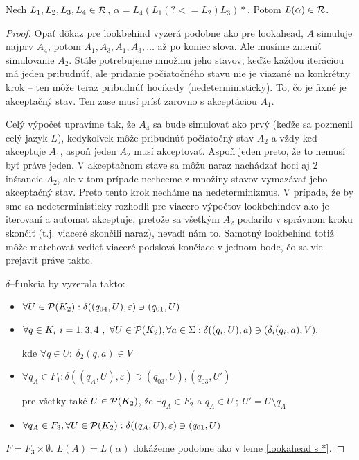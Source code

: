 \begin{lema}\label{lookbehind s *}
Nech $L_1,L_2,L_3,L_4 \in \R$, $\alpha = L_4 \left( L_1 \left( ?<=L_2\right) L_3 \right) *$. Potom $L(\alpha) \in \R$.
\end{lema} 
\begin{proof}
Opäť dôkaz pre lookbehind vyzerá podobne ako pre lookahead, $A$ simuluje naj\-prv $A_4$, potom $A_1,A_3,A_1,A_3, \dots$ až po koniec slova. Ale musíme zmeniť simulovanie $A_2$. Stále potrebujeme množinu jeho stavov, keďže každou iteráciou má jeden pribudnúť, ale pridanie počiatočného stavu nie je viazané na konkrétny krok -- ten môže teraz pribudnúť hocikedy (nedeterministicky). To, čo je fixné je akceptačný stav. Ten zase musí prísť zarovno s akceptáciou $A_1$. 

Celý výpočet upravíme tak, že $A_4$ sa bude simulovať ako prvý (keďže sa pozmenil celý jazyk $L$), kedykoľvek môže pribudnúť počiatočný stav $A_2$ a vždy keď akceptuje $A_1$, aspoň jeden $A_2$ musí akceptovať. Aspoň jeden preto, že to nemusí byť práve jeden. V akceptačnom stave sa môžu naraz nachádzať hoci aj 2 inštancie $A_2$, ale v tom prípade nechceme z množiny stavov vymazávať jeho akceptačný stav. Preto tento krok necháme na nedeterminizmus. V prípade, že by sme sa nedeterministicky rozhodli pre viacero výpočtov lookbehindov ako je iterovaní a automat akceptuje, pretože sa všetkým $A_2$ podarilo v správnom kroku skončiť (t.j. viaceré skončili naraz), nevadí nám to. Samotný lookbehind totiž môže matchovať vedieť viaceré podslová končiace v jednom bode, čo sa vie prejaviť práve takto. 

$\delta$--funkcia by vyzerala takto:

\begin{itemize}
  \item $\forall U \in \P(K_2) : \delta ((q_{04},U),\varepsilon ) \ni (q_{01},U)$
  \item $\forall q \in K_i~i=1,3,4 ~, ~\forall U \in \P(K_2),\forall a \in \Sigma : \delta ((q_i,U),a) \ni (\delta _i (q_i,a),V),$
  
  kde $\forall q \in U:~\delta_2(q,a) \in V$
  \item $\forall q_A \in F_1 : \delta ((q_A,U),\varepsilon ) \ni (q_{03},U), (q_{03},U')$
  
  pre všetky také $U \in \P(K_2)$, že $ \exists q_A \in F_2$ a $ q_A \in U ~ ; ~ U'=U \setminus q_A$
  \item $\forall q_A \in F_3, \forall U \in \P(K_2) : \delta ((q_A,U),\varepsilon ) \ni (q_{01},U)$
\end{itemize}
$F = F_3 \times \emptyset$. $L(A) = L(\alpha)$ dokážeme podobne ako v leme \ref{lookahead s *}.
\end{proof}

